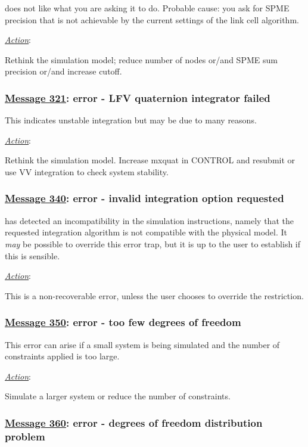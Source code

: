 \D does not like what you are asking it to do.  Probable cause:
you ask for SPME precision that is not achievable by the current
settings of the link cell algorithm.

\noindent \underline{\em Action}:

Rethink the simulation model; reduce number of nodes or/and SPME sum
precision or/and increase cutoff.

\subsubsection*{\underline{Message 321}: error - LFV quaternion integrator failed}

This indicates unstable integration but may be due to many reasons.

\noindent \underline{\em Action}:

Rethink the simulation model.  Increase mxquat in CONTROL and resubmit or use VV integration to check system stability.

\subsubsection*{\underline{Message 340}: error - invalid integration option requested}

\D has detected an incompatibility in the simulation instructions,
namely that the requested integration algorithm is not compatible
with the physical model.  It {\em may} be possible to override
this error trap, but it is up to the user to establish if this is
sensible.

\noindent \underline{\em Action}:

This is a non-recoverable error, unless the user chooses to
override the restriction.

\subsubsection*{\underline{Message 350}: error - too few degrees of freedom}

This error can arise if a small system is being simulated and the
number of constraints applied is too large.

\noindent \underline{\em Action}:

Simulate a larger system or reduce the number of constraints.

\subsubsection*{\underline{Message 360}: error - degrees of freedom distribution problem}

